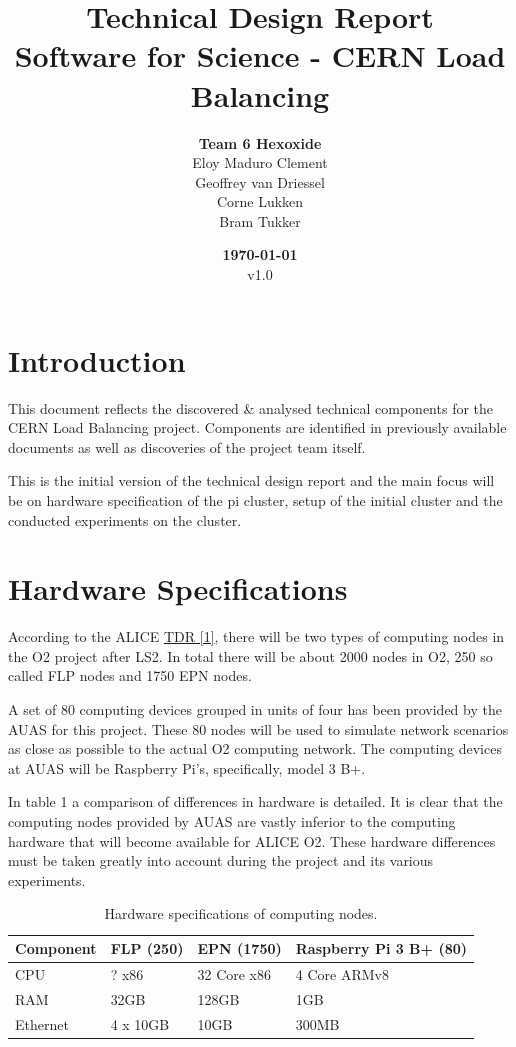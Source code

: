 \documentclass[]{article}
\title{Technical Design Report \\
	\large Software for Science - CERN Load Balancing}
\author{\textbf{Team 6 Hexoxide} \\
	Eloy Maduro Clement \\
	Geoffrey van Driessel \\
	Corne Lukken \\
	Bram Tukker}
\date{\textbf{\today} \\
	v1.0}
\begin{document}
\maketitle
\newpage


\section{Introduction}

This document reflects the discovered \& analysed technical components for the CERN Load Balancing project. Components are identified in previously available documents as well as discoveries of the project team itself.

This is the initial version of the technical design report and the main focus will be on hardware specification of the pi cluster, setup of the initial cluster and the conducted experiments on the cluster.


\section{Hardware Specifications}

According to the \acrfull{ALICE} \hyperref[sec:ref01]{\acrfull{TDR} [1]}, there will be two types of computing nodes in the O2 project after \acrfull{LS2}. In total there will be about 2000 nodes in O2, 250 so called FLP nodes and 1750 EPN nodes.

A set of 80 computing devices grouped in units of four has been provided by the \acrfull{AUAS} for this project. These 80 nodes will be used to simulate network scenarios as close as possible to the actual O2 computing network. The computing devices at \acrshort{AUAS} will be Raspberry Pi’s, specifically, model 3 B+.

In table 1 a comparison of differences in hardware is detailed. It is clear that the computing nodes provided by \acrshort{AUAS} are vastly inferior to the computing hardware that will become available for \acrshort{ALICE} O2. These hardware differences must be taken greatly into account during the project and its various experiments.

\begin{table}[H]
	\begin{center}
		\begin{tabular}{ | l | l | l | l | }
			\hline
			Component & FLP (250) & EPN (1750) & Raspberry Pi 3 B+ (80) \\ \hline
			CPU & ? x86 & 32 Core x86 & 4 Core ARMv8 \\ \hline
			RAM & 32GB & 128GB & 1GB \\ \hline
			Ethernet & 4 x 10GB & 10GB & 300MB \\
			\hline
		\end{tabular}
		\caption{Hardware specifications of computing nodes.}
		\label{tab:specs}
	\end{center}
\end{table}
\end{document}
